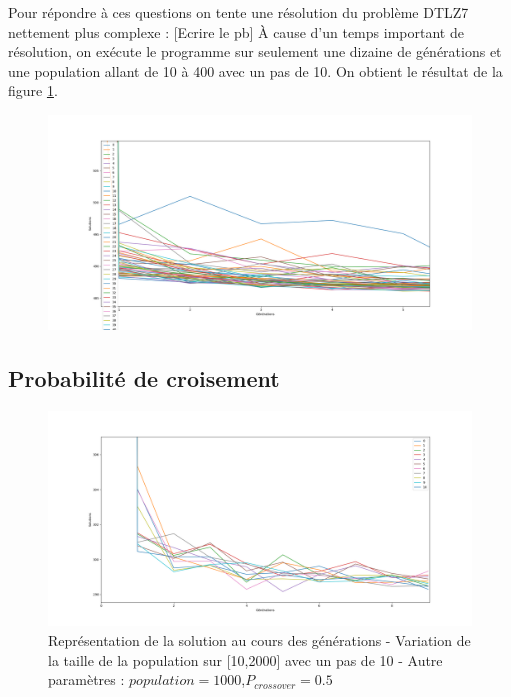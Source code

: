\documentclass[12pt]{report}
\begin{document}
      Pour répondre à ces questions on tente une résolution du problème DTLZ7 nettement plus complexe :
      [Ecrire le pb]
      À cause d'un temps important de résolution, on exécute le programme sur seulement une dizaine de générations et une population allant de 10 à 400 avec un pas de 10.
      On obtient le résultat de la figure \ref{DTLZ7_pop}.
      \begin{figure}[h]
        \centering
        \includegraphics[width=15cm]{img/DTLZ7_pop.png}
        \caption{}
        \label{DTLZ7_pop}
      \end{figure}

      \subsection{Probabilité de croisement}
      \begin{figure}[h]
        \centering
        \includegraphics[width=15cm]{img/DTLZ7_crossover.png}
        \caption{Représentation de la solution au cours des générations - Variation de la taille de la population sur [10,2000] avec un pas de 10 - Autre paramètres : $population = 1000$,$P_{crossover} = 0.5$}
        \label{sch_crossover_moy}
      \end{figure}
\end{document}
